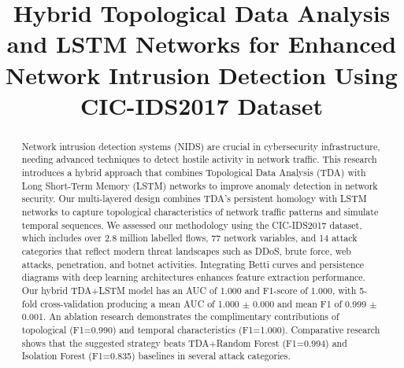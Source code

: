 \documentclass[conference]{IEEEtran}
\begin{document}
\title{Hybrid Topological Data Analysis and LSTM Networks for Enhanced Network Intrusion Detection Using CIC-IDS2017 Dataset}

\author{
}

\maketitle

\begin{abstract}
Network intrusion detection systems (NIDS) are crucial in cybersecurity infrastructure, needing advanced techniques to detect hostile activity in network traffic. This research introduces a hybrid approach that combines Topological Data Analysis (TDA) with Long Short-Term Memory (LSTM) networks to improve anomaly detection in network security. Our multi-layered design combines TDA's persistent homology with LSTM networks to capture topological characteristics of network traffic patterns and simulate temporal sequences. We assessed our methodology using the CIC-IDS2017 dataset, which includes over 2.8 million labelled flows, 77 network variables, and 14 attack categories that reflect modern threat landscapes such as DDoS, brute force, web attacks, penetration, and botnet activities. Integrating Betti curves and persistence diagrams with deep learning architectures enhances feature extraction performance. Our hybrid TDA+LSTM model has an AUC of 1.000 and F1-score of 1.000, with 5-fold cross-validation producing a mean AUC of 1.000 $\pm$ 0.000 and mean F1 of 0.999 $\pm$ 0.001. An ablation research demonstrates the complimentary contributions of topological (F1=0.990) and temporal characteristics (F1=1.000). Comparative research shows that the suggested strategy beats TDA+Random Forest (F1=0.994) and Isolation Forest (F1=0.835) baselines in several attack categories.
\end{abstract}
\end{document}
